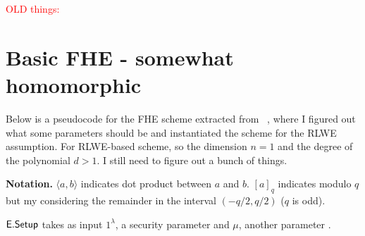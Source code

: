 \documentclass[11pt]{article}
\begin{document}
\newpage

\textcolor{red}{OLD things:}

\section{Basic FHE - somewhat homomorphic}



Below is a pseudocode for the FHE scheme extracted from ~\cite{BGV12}, where I figured out what some parameters should be and instantiated the scheme for the RLWE assumption. 
For RLWE-based scheme, so the dimension $n=1$ and the degree of the polynomial $d>1$. I still need to figure out a bunch of things. 


\textbf{Notation.} $\langle a, b \rangle$ indicates dot product between $a$ and $b$.  $[a]_q$ indicates modulo $q$ but my considering the remainder in the interval $(-q/2, q/2)$ ($q$ is odd). 


$\mathsf{E.Setup}$ takes as input $1^\lambda$, a security parameter and $\mu$, another parameter .




\end{document}
